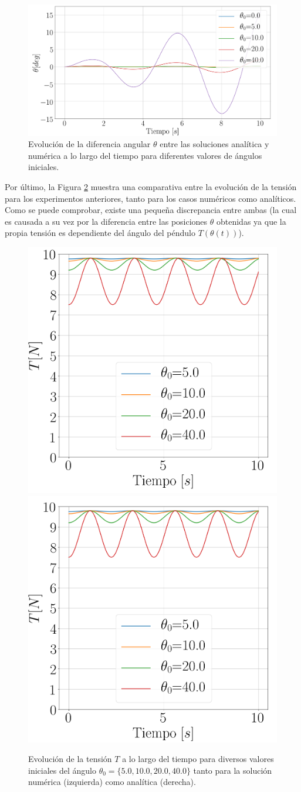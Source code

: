 \documentclass[journal]{IEEEtran}
\begin{document}
\begin{figure}[!htb]
  \centering
  \includegraphics[width=\linewidth]{theta_diff}
  \caption{Evolución de la diferencia angular $\theta$ entre las soluciones analítica y numérica a lo largo del tiempo para diferentes valores de ángulos iniciales.}
  \label{fig:diff}
\end{figure}

Por último, la Figura \ref{fig:tensiones_diff} muestra una comparativa entre la evolución de la tensión para los experimentos anteriores, tanto para los casos numéricos como analíticos. Como se puede comprobar, existe una pequeña discrepancia entre ambas (la cual es causada a su vez por la diferencia entre las posiciones $\theta$ obtenidas ya que la propia tensión es dependiente del ángulo del péndulo $T(\theta(t))$).

\begin{figure}[!htb]
  \centering
  \includegraphics[width=0.49\linewidth]{tension_diff}
  \includegraphics[width=0.49\linewidth]{tension_diff_approx}
  \caption{Evolución de la tensión $T$ a lo largo del tiempo para diversos valores iniciales del ángulo $\theta_0 = \{5.0, 10.0, 20.0, 40.0\}$ tanto para la solución numérica (izquierda) como analítica (derecha).}
  \label{fig:tensiones_diff}
\end{figure}
\end{document}
